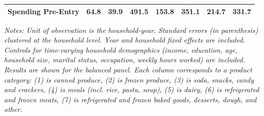 {{\begin{threeparttable}
\begin{tabular}{l*{7}{c}}
Spending Pre-Entry&     64.8         &     39.9         &    491.5         &    153.8         &    351.1         &    214.7         &    331.7         \\
\bottomrule
\end{tabular}
\begin{tablenotes}[flushleft]
\small 
\item \textit{Notes: Unit of observation is the household-year. Standard errors (in parenthesis) clustered at the household level. Year and household fixed effects are included. Controls for time-varying household demographics (income, education, age, household size, marital status, occupation, weekly hours worked) are included. Results are shown for the balanced panel. Each column corresponds to a product category: (1) is canned produce, (2) is frozen produce, (3) is soda, snacks, candy and crackers, (4) is meals (incl. rice, pasta, soup), (5) is dairy, (6) is refrigerated and frozen meats, (7) is refrigerated and frozen baked goods, desserts, dough, and other.}
\end{tablenotes}


\end{threeparttable}}
}
